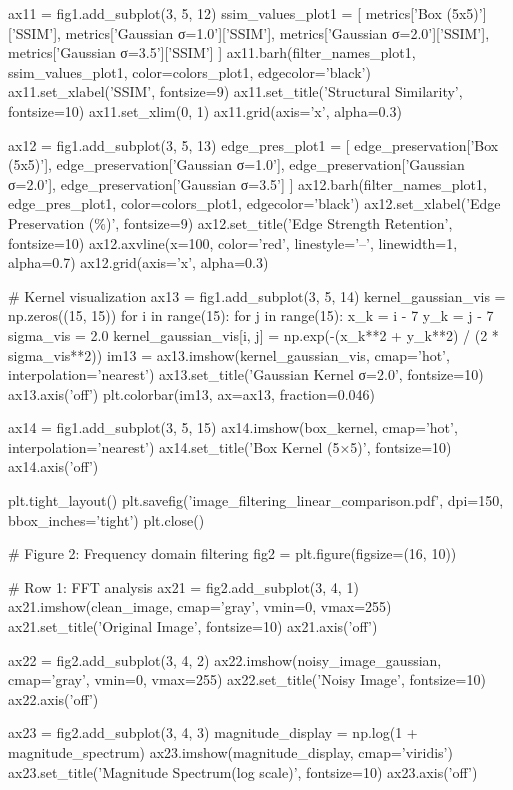 \documentclass[a4paper, 11pt]{article}
\begin{document}
\begin{pycode}
ax11 = fig1.add_subplot(3, 5, 12)
ssim_values_plot1 = [
    metrics['Box (5x5)']['SSIM'],
    metrics['Gaussian σ=1.0']['SSIM'],
    metrics['Gaussian σ=2.0']['SSIM'],
    metrics['Gaussian σ=3.5']['SSIM']
]
ax11.barh(filter_names_plot1, ssim_values_plot1, color=colors_plot1, edgecolor='black')
ax11.set_xlabel('SSIM', fontsize=9)
ax11.set_title('Structural Similarity', fontsize=10)
ax11.set_xlim(0, 1)
ax11.grid(axis='x', alpha=0.3)

ax12 = fig1.add_subplot(3, 5, 13)
edge_pres_plot1 = [
    edge_preservation['Box (5x5)'],
    edge_preservation['Gaussian σ=1.0'],
    edge_preservation['Gaussian σ=2.0'],
    edge_preservation['Gaussian σ=3.5']
]
ax12.barh(filter_names_plot1, edge_pres_plot1, color=colors_plot1, edgecolor='black')
ax12.set_xlabel('Edge Preservation (\%)', fontsize=9)
ax12.set_title('Edge Strength Retention', fontsize=10)
ax12.axvline(x=100, color='red', linestyle='--', linewidth=1, alpha=0.7)
ax12.grid(axis='x', alpha=0.3)

# Kernel visualization
ax13 = fig1.add_subplot(3, 5, 14)
kernel_gaussian_vis = np.zeros((15, 15))
for i in range(15):
    for j in range(15):
        x_k = i - 7
        y_k = j - 7
        sigma_vis = 2.0
        kernel_gaussian_vis[i, j] = np.exp(-(x_k**2 + y_k**2) / (2 * sigma_vis**2))
im13 = ax13.imshow(kernel_gaussian_vis, cmap='hot', interpolation='nearest')
ax13.set_title('Gaussian Kernel σ=2.0', fontsize=10)
ax13.axis('off')
plt.colorbar(im13, ax=ax13, fraction=0.046)

ax14 = fig1.add_subplot(3, 5, 15)
ax14.imshow(box_kernel, cmap='hot', interpolation='nearest')
ax14.set_title('Box Kernel (5×5)', fontsize=10)
ax14.axis('off')

plt.tight_layout()
plt.savefig('image_filtering_linear_comparison.pdf', dpi=150, bbox_inches='tight')
plt.close()

# Figure 2: Frequency domain filtering
fig2 = plt.figure(figsize=(16, 10))

# Row 1: FFT analysis
ax21 = fig2.add_subplot(3, 4, 1)
ax21.imshow(clean_image, cmap='gray', vmin=0, vmax=255)
ax21.set_title('Original Image', fontsize=10)
ax21.axis('off')

ax22 = fig2.add_subplot(3, 4, 2)
ax22.imshow(noisy_image_gaussian, cmap='gray', vmin=0, vmax=255)
ax22.set_title('Noisy Image', fontsize=10)
ax22.axis('off')

ax23 = fig2.add_subplot(3, 4, 3)
magnitude_display = np.log(1 + magnitude_spectrum)
ax23.imshow(magnitude_display, cmap='viridis')
ax23.set_title('Magnitude Spectrum\n(log scale)', fontsize=10)
ax23.axis('off')


\end{pycode}
\end{document}
